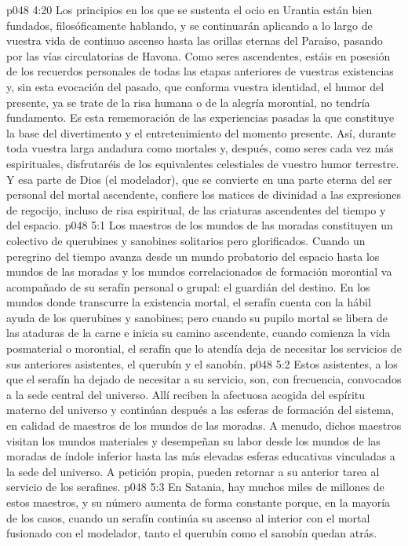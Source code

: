 \vs p048 4:20 Los principios en los que se sustenta el ocio en Urantia están bien fundados, filosóficamente hablando, y se continuarán aplicando a lo largo de vuestra vida de continuo ascenso hasta las orillas eternas del Paraíso, pasando por las vías circulatorias de Havona. Como seres ascendentes, estáis en posesión de los recuerdos personales de todas las etapas anteriores de vuestras existencias y, sin esta evocación del pasado, que conforma vuestra identidad, el humor del presente, ya se trate de la risa humana o de la alegría morontial, no tendría fundamento. Es esta rememoración de las experiencias pasadas la que constituye la base del divertimento y el entretenimiento del momento presente. Así, durante toda vuestra larga andadura como mortales y, después, como seres cada vez más espirituales, disfrutaréis de los equivalentes celestiales de vuestro humor terrestre. Y esa parte de Dios (el modelador), que se convierte en una parte eterna del ser personal del mortal ascendente, confiere los matices de divinidad a las expresiones de regocijo, incluso de risa espiritual, de las criaturas ascendentes del tiempo y del espacio.
\vs p048 5:1 Los maestros de los mundos de las moradas constituyen un colectivo de querubines y sanobines solitarios pero glorificados. Cuando un peregrino del tiempo avanza desde un mundo probatorio del espacio hasta los mundos de las moradas y los mundos correlacionados de formación morontial va acompañado de su serafín personal o grupal: el guardián del destino. En los mundos donde transcurre la existencia mortal, el serafín cuenta con la hábil ayuda de los querubines y sanobines; pero cuando su pupilo mortal se libera de las ataduras de la carne e inicia su camino ascendente, cuando comienza la vida posmaterial o morontial, el serafín que lo atendía deja de necesitar los servicios de sus anteriores asistentes, el querubín y el sanobín.
\vs p048 5:2 Estos asistentes, a los que el serafín ha dejado de necesitar a su servicio, son, con frecuencia, convocados a la sede central del universo. Allí reciben la afectuosa acogida del espíritu materno del universo y continúan después a las esferas de formación del sistema, en calidad de maestros de los mundos de las moradas. A menudo, dichos maestros visitan los mundos materiales y desempeñan su labor desde los mundos de las moradas de índole inferior hasta las más elevadas esferas educativas vinculadas a la sede del universo. A petición propia, pueden retornar a su anterior tarea al servicio de los serafines.
\vs p048 5:3 En Satania, hay muchos miles de millones de estos maestros, y su número aumenta de forma constante porque, en la mayoría de los casos, cuando un serafín continúa su ascenso al interior con el mortal fusionado con el modelador, tanto el querubín como el sanobín quedan atrás.
